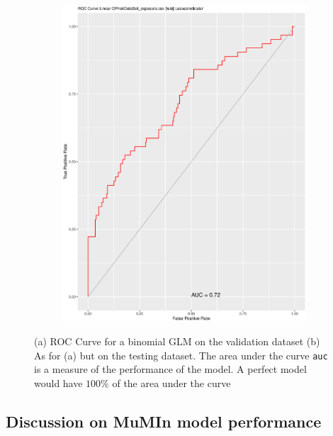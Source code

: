 \documentclass{DissertateUSU}
\begin{document}
\begin{figure}
\begin{subfigure}[b]{0.5\textwidth}
   \includegraphics[width=1\linewidth]{ROCCurve_Testing.eps}
   \caption{}
   \label{ROC_Testing_dataset}
\end{subfigure}

\caption[ROC Curves for GLM over validation and testing set]{(a) ROC Curve for a binomial GLM on the validation dataset (b) As for (a) but on the testing dataset. The area under the curve \texttt{auc} is a measure of the performance of the model. A perfect model would have $100\%$ of the area under the curve}
\end{figure}

\singlespacing

\doublespacing

\subsection{Discussion on MuMIn model performance}
\label{ssec:Discussion on MuMIn model performance}
\end{document}
